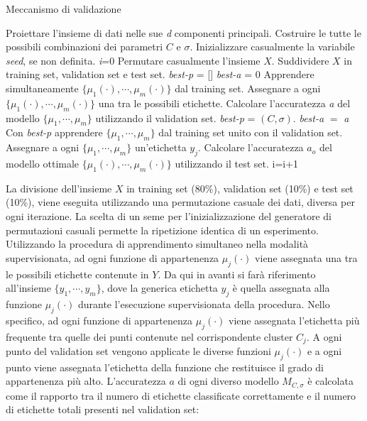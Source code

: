 \documentclass [11pt,a4paper,twoside,openright] {book}
\begin{document}
\begin{algorithm}
\caption{Meccanismo di validazione}\label{validazione}
\begin{algorithmic}[1]
\State Proiettare l'insieme di dati nelle sue \textit{d} componenti principali.
\State Costruire le tutte le possibili combinazioni dei parametri $C$ e $\sigma$.
\State Inizializzare casualmente la variabile \textit{seed}, se non definita. 
\State \textit{i}=0
\State Permutare casualmente l'insieme $X$.
\State Suddividere $X$ in training set, validation set e test set.
\State \textit{best-p} = []
\State \textit{best-a} = 0
\State Apprendere simultaneamente $\lbrace \mu_1(\cdot), \cdots, \mu_m(\cdot) \rbrace$ dal training set.
\State Assegnare a ogni $\lbrace \mu_1(\cdot), \cdots, \mu_m(\cdot) \rbrace$ una tra le possibili etichette.
\State Calcolare l'accuratezza \textit{a} del modello $\lbrace \mu_1, \cdots, \mu_m \rbrace$ utilizzando il validation set.
 \State \textit{best-p} = $(C, \sigma)$. \State \textit{best-a} $=$ \textit{a} \EndIf
\EndFor
\State Con \textit{best-p} apprendere $\lbrace \mu_1, \cdots, \mu_m \rbrace$ dal training set unito con il validation set.
\State Assegnare a ogni $\lbrace \mu_1, \cdots, \mu_m \rbrace$ un'etichetta $y_j$.
\State Calcolare l'accuratezza {$a_o$} del modello ottimale $\lbrace \mu_1(\cdot), \cdots, \mu_m(\cdot) \rbrace$ utilizzando il test set.
\State i=i+1
\EndWhile
\end{algorithmic}
\end{algorithm}
\noindent
La divisione dell'insieme $X$ in training set (80\%), validation set (10\%) e test set (10\%), viene eseguita utilizzando una permutazione casuale dei dati, diversa per ogni iterazione. La scelta di un seme per l'inizializzazione del generatore di permutazioni casuali permette la ripetizione identica di un esperimento.
Utilizzando la procedura di apprendimento simultaneo nella modalità supervisionata, ad ogni funzione di appartenenza $\mu_j(\cdot)$ viene assegnata una tra le possibili etichette contenute in $Y$. Da qui in avanti si farà riferimento all'insieme $\lbrace y_1, \cdots, y_m \rbrace$, dove la generica etichetta $y_j$ è quella assegnata alla funzione $\mu_j(\cdot)$ durante l'esecuzione supervisionata della procedura. Nello specifico, ad ogni funzione di appartenenza $\mu_j(\cdot)$ viene assegnata l'etichetta più frequente tra quelle dei punti contenute nel corrispondente cluster $C_j$.
A ogni punto del validation set vengono applicate le diverse funzioni $\mu_j(\cdot)$ e a ogni punto viene assegnata l'etichetta della funzione che restituisce il grado di appartenenza più alto. L'accuratezza $a$ di ogni diverso modello $M_{C,\sigma}$ è calcolata come il rapporto tra il numero di etichette classificate correttamente e il numero di etichette totali presenti nel validation set:
\end{document}
